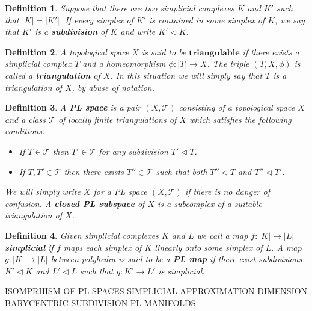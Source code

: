\documentclass[11pt]{book}
\newtheorem{definition}{Definition}
\begin{document}
\begin{definition}
Suppose that there are two simplicial complexes $K$ and $K'$ such that $|K| = |K'|$. If every simplex of $K'$ is contained in some simplex of $K$, we say that $K'$ is a \textbf{subdivision} of $K$ and write $K' \lhd K$.
\end{definition}


\begin{definition}
A topological space $X$ is said to be $\mathbf{triangulable}$ if there exists a simplicial complex $T$ and a homeomorphism $\phi : |T| \to X$. The triple $(T,X, \phi)$ is called a \textbf{triangulation} of $X$. In this situation we will simply say that $T$ is a triangulation of $X$, by abuse of notation.
\end{definition}


\begin{definition}
A \textbf{PL space} is a pair $(X,\mathcal{T})$ consisting of a topological space $X$ and a class $\mathcal{T}$ of locally finite triangulations of $X$ which satisfies the following conditions:
\begin{itemize}
\item If $T \in \mathcal{T}$ then $T' \in \mathcal{T}$ for any subdivision $T' \lhd T$.
\item If $T,T' \in \mathcal{T}$ then there exists $T'' \in \mathcal{T}$ such that both $T'' \lhd T$ and $T'' \lhd T'$.
\end{itemize}
We will simply write $X$ for a PL space $(X,\mathcal{T})$ if there is no danger of confusion. A \textbf{closed PL subspace} of $X$ is a subcomplex of a suitable triangulation of $X$.
\end{definition}

\begin{definition}
Given simplicial complexes $K$ and $L$ we call a map $f: |K| \to |L|$ \textbf{simplicial} if $f$ maps each simplex of $K$ linearly onto some simplex of $L$. A map $g: |K| \to |L|$ between polyhedra  is said to be a \textbf{PL map} if there exist subdivisions $K' \lhd K$ and $L' \lhd L$ such that $g: K' \to L' $ is simplicial.
\end{definition}

ISOMPRHISM OF PL SPACES
SIMPLICIAL APPROXIMATION
DIMENSION
BARYCENTRIC SUBDIVISION
PL MANIFOLDS
\end{document}
